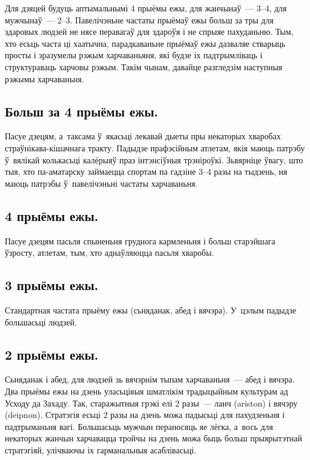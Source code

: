 Для дзяцей будуць аптымальнымі 4 прыёмы ежы, для жанчынаў~--- 3--4, для мужчынаў~--- 2--3. Павелічэньне частаты прыёмаў ежы больш за тры для здаровых людзей не нясе перавагаў для здароўя і не спрыяе пахуданьню. Тым, хто есьць часта ці хаатычна, парадкаваньне прыёмаў ежы дазваляе стварыць просты і зразумелы рэжым харчаваньяня, які будзе іх падтрымліваць і структураваць харчовы рэжым. Такім чынам, давайце разгледзім наступныя рэжымы харчаваньня.

\subsection{Больш за 4 прыёмы ежы.}
Пасуе дзецям, а~таксама ў~якасьці лекавай дыеты пры некаторых хваробах страўнікава-кішачнага тракту. Падыдзе прафэсійным атлетам, якія маюць патрэбу ў~вялікай колькасьці калёрыяў праз інтэнсіўныя трэніроўкі. Зьвярніце ўвагу, што тыя, хто па-аматарску займаецца спортам па гадзіне 3--4 разы на тыдзень, ня маюць патрэбы ў~павелічэньні частаты харчаваньня.


\subsection{4 прыёмы ежы.}
Пасуе дзецям пасьля спыненьня груднога кармленьня і больш старэйшага ўзросту, атлетам, тым, хто аднаўляюцца пасьля хваробы.

\subsection{3 прыёмы ежы.}
Стандартная частата прыёму ежы (сьняданак, абед і вячэра). У~цэлым падыдзе большасьці людзей.

\subsection{2 прыёмы ежы.}
Сьняданак і абед, для людзей зь вячэрнім тыпам харчаваньня~--- абед і вячэра. Два прыёмы ежы на дзень уласьцівыя шматлікім традыцыйным культурам ад Усходу да Захаду. Так, старажытныя грэкі елі 2 разы~--- ланч (ariston) і вячэру (deipnon). Стратэгія есьці 2 разы на дзень можа падысьці для пахудзеньня і падтрыманьня вагі. Большасьць мужчын пераносяць яе лёгка, а~вось для некаторых жанчын харчавацца тройчы на дзень можа быць больш прыярытэтнай стратэгіяй, улічваючы іх гарманальныя асаблівасьці.

